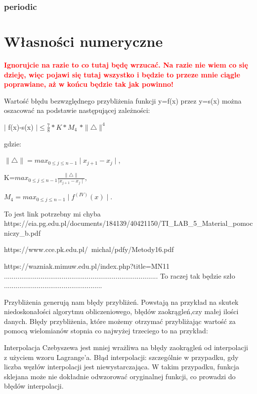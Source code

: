 \documentclass{article}
\begin{document}
\subsubsection{periodic}


\cite{kincaid_cheney}

\section{Własności numeryczne}
\textbf{\textcolor{red}{Ignorujcie na razie to co tutaj będę wrzucać. Na razie nie wiem co się dzieję, więc pojawi się tutaj wszystko i będzie to przeze mnie ciągle poprawiane, aż w końcu będzie tak jak powinno!}}


Wartość błędu bezwzględnego przybliżenia funkcji y=f(x) przez y=s(x) można
oszacować na podstawie następującej zależności:

$\mid$ f(x)-s(x) $\mid \leq \frac{7}{8} \ast {K} \ast$$ M_4$ $\ast \parallel \bigtriangleup \parallel^4$

gdzie:

$\parallel \bigtriangleup \parallel=max_{0\leq j \leq n-1}\mid x_{j+1}-x_{j}\mid$,

K=$max_{0\leq j \leq n-1} \frac{\parallel \bigtriangleup \parallel}{\mid x_{j+1}-x_j \mid }$,

$M_4=max_{0\leq j \leq n-1}\mid f^{(IV)}(x)\mid$.

 To jest link potrzebny mi chyba
 https://eia.pg.edu.pl/documents/184139/40421150/TI_LAB_5_Material_pomocniczy_b.pdf
 


https://www.cce.pk.edu.pl/~michal/pdfy/Metody16.pdf

https://wazniak.mimuw.edu.pl/index.php?title=MN11
................................................................................   To raczej tak będzie szło ...................................................

Przybliżenia generują nam błędy przybliżeń. Powstają na przykład na skutek niedoskonałości algorytmu obliczeniowego, błędów zaokrągleń,czy małej ilości danych.
Błędy przybliżenia, które możemy otrzymać przybliżając wartość za pomocą wielomianów stopnia co najwyżej trzeciego to na przykład:

Interpolacja Czebyszewa jest mniej wrażliwa na błędy zaokrągleń od
interpolacji z użyciem wzoru Lagrange'a.
Błąd interpolacji: szczególnie w przypadku, gdy liczba węzłów interpolacji jest niewystarczająca. W takim przypadku, funkcja sklejana może nie dokładnie odwzorować oryginalnej funkcji, co prowadzi do błędów interpolacji.
\end{document}
